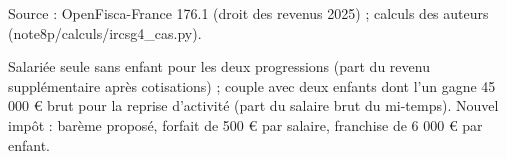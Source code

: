 Source : OpenFisca-France 176.1 (droit des revenus 2025) ; calculs des auteurs (note8p/calculs/ircsg4\_cas.py).\par Salariée seule sans enfant pour les deux progressions (part du revenu supplémentaire après cotisations) ; couple avec deux enfants dont l'un gagne 45 000 € brut pour la reprise d'activité (part du salaire brut du mi-temps). Nouvel impôt : barème proposé, forfait de 500 € par salaire, franchise de 6 000 € par enfant.

